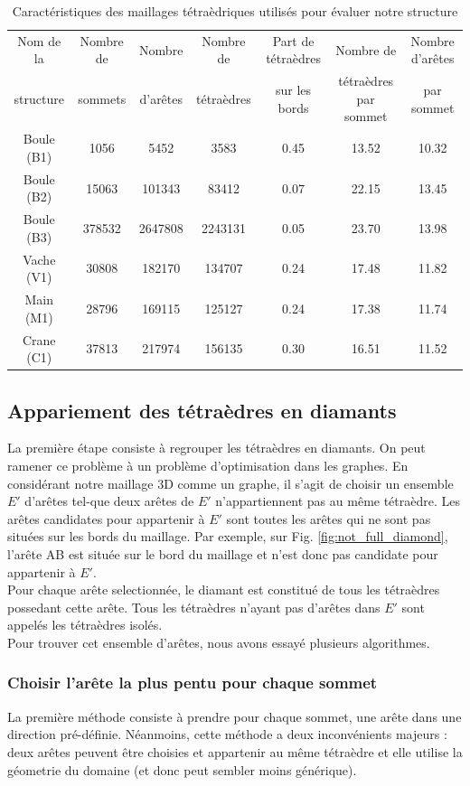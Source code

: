 \documentclass[a4paper,11pt,openany]{article}
\begin{document}
\begin{table}[H]
\footnotesize
\begin{tabular}{|c | c | c | c | c| c | c |}
\hline
Nom de la & Nombre de & Nombre& Nombre de & Part de tétraèdres & Nombre de & Nombre d'arêtes\\
structure&sommets&d'arêtes &tétraèdres&sur les bords&tétraèdres par sommet & par sommet\\
\hline
Boule (B1) & 1056 & 5452 & 3583 & 0.45 & 13.52 & 10.32 \\
Boule (B2)& 15063 & 101343 & 83412 & 0.07 & 22.15 & 13.45\\
Boule (B3)& 378532 & 2647808 & 2243131 & 0.05 & 23.70 & 13.98 \\
Vache (V1)& 30808 & 182170 & 134707 & 0.24 & 17.48 & 11.82 \\
Main (M1)& 28796 & 169115 & 125127 & 0.24 & 17.38 & 11.74\\
Crane (C1)& 37813 & 217974 & 156135 & 0.30 & 16.51 & 11.52 \\ 
\hline  
\end{tabular}
\label{Tab:results_performances}
\caption{Caractéristiques des maillages tétraèdriques utilisés pour évaluer notre structure}
\end{table}

\subsection{Appariement des tétraèdres en diamants}
\noindent
La première étape consiste à regrouper les tétraèdres en diamants. On peut ramener ce problème à un problème d'optimisation dans les graphes. En considérant notre maillage 3D comme un graphe, il s'agit de choisir un ensemble $E'$ d'arêtes tel-que deux arêtes de $E'$ n'appartiennent pas au même tétraèdre. Les arêtes candidates pour appartenir à $E'$ sont toutes les arêtes qui ne sont pas situées sur les bords du maillage. Par exemple, sur Fig. \ref{fig:not_full_diamond}, l'arête AB est située sur le bord du maillage et n'est donc pas candidate pour appartenir à $E'$.\\
Pour chaque arête selectionnée, le diamant est constitué de tous les tétraèdres possedant cette arête. Tous les tétraèdres n'ayant pas d'arêtes dans $E'$ sont appelés les tétraèdres isolés.\\
Pour trouver cet ensemble d'arêtes, nous avons essayé plusieurs algorithmes.
\subsubsection{Choisir l'arête la plus pentu pour chaque sommet}
\noindent
La première méthode consiste à prendre pour chaque sommet, une arête dans une direction pré-définie. Néanmoins, cette méthode a deux inconvénients majeurs : deux arêtes peuvent être choisies et appartenir au même tétraèdre et elle utilise la géometrie du domaine (et donc peut sembler moins générique).
\end{document}
